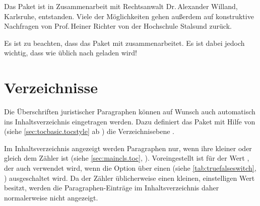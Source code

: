 Das Paket ist in Zusammenarbeit mit Rechtsanwalt Dr.\,Alexander Willand,
Karlsruhe, entstanden. Viele der Möglichkeiten gehen außerdem auf konstruktive
Nachfragen von Prof.\,Heiner Richter von der Hochschule Stalsund zurück.

Es ist zu beachten, dass das Paket mit
 zusammenarbeitet. Es ist dabei
jedoch wichtig, dass  wie üblich nach 
geladen wird!



\section{Verzeichnisse}
\label{sec:scrjura.toc}

Die Überschriften juristischer Paragraphen können auf Wunsch auch automatisch
ins Inhaltsverzeichnis eingetragen
werden. Dazu definiert das Paket mit Hilfe
von  (siehe
\autoref{sec:tocbasic.tocstyle} ab
)
die Verzeichnisebene .

\begin{Declaration}
\end{Declaration}
Im Inhaltsverzeichnis angezeigt werden
Paragraphen nur, wenn ihre 
kleiner oder gleich dem Zähler %
 ist
(siehe \autoref{sec:maincls.toc},
). Voreingestellt
ist für  der Wert , der auch verwendet
wird, wenn die Option über einen
 (siehe
\autoref{tab:truefalseswitch}, )
ausgeschaltet wird. Da der Zähler 
üblicherweise einen kleinen, einstelligen Wert besitzt, werden die
Paragraphen-Einträge im Inhaltsverzeichnis daher normalerweise nicht
angezeigt.

